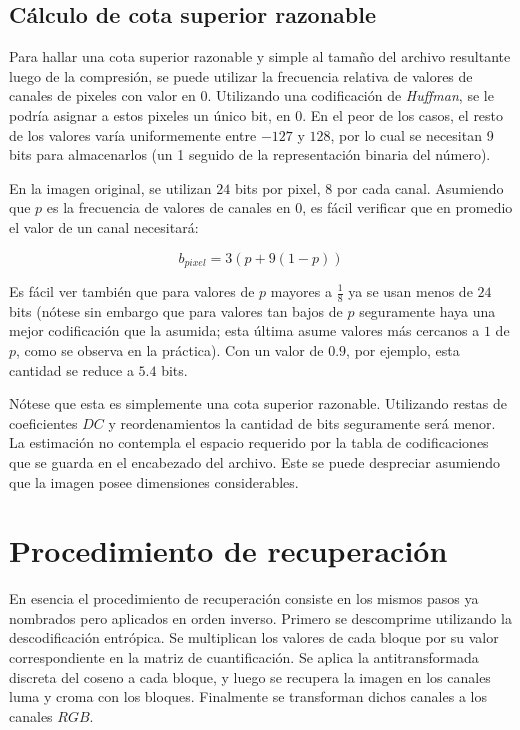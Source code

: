 \documentclass[%
	final,
	reprint,
	notitlepage,
	narroweqnarray,
	inline,
	twoside,
	invited
	]{ieee}
\begin{document}
\subsection{Cálculo de cota superior razonable}

\par Para hallar una cota superior razonable y simple al tamaño del archivo resultante luego de la compresión,
 se puede 
utilizar la frecuencia relativa de valores de canales de pixeles con valor en 0. 
Utilizando una codificación de \textit{Huffman}, 
se le podría asignar a estos pixeles un único bit, en 0. En el peor de los casos, el resto de los valores 
varía uniformemente entre $-127$ y $128$, por lo cual se necesitan 9 bits para almacenarlos (un 1 seguido 
de la representación binaria del número).
\par En la imagen original, se utilizan $24$ bits por pixel, $8$ por cada canal. Asumiendo que $p$ es la frecuencia 
de valores de canales en 0, es fácil verificar que en promedio el valor de un canal necesitará:

\begin{equation}
b_{pixel}=3(p+9(1-p))
\end{equation}

\par Es fácil ver también que para valores de $p$ mayores a $\frac{1}{8}$ ya se usan menos de $24$ bits (nótese sin 
embargo que para valores tan bajos de $p$ seguramente haya una mejor codificación que la asumida; esta última asume 
valores más cercanos a $1$ de $p$, como se observa en la práctica). Con un valor de $0.9$, por ejemplo, esta cantidad 
se reduce a $5.4$ bits.
\par Nótese que esta es simplemente una cota superior razonable. Utilizando restas de coeficientes $DC$ y reordenamientos 
la cantidad de bits seguramente será menor. La estimación no contempla el espacio requerido por la tabla de codificaciones 
que se guarda en el encabezado del archivo. Este se puede despreciar asumiendo que la imagen posee dimensiones considerables.



\section{Procedimiento de recuperación}

En esencia el procedimiento de recuperación consiste en los mismos pasos ya nombrados pero aplicados 
en orden inverso. Primero se descomprime utilizando la descodificación entrópica. Se multiplican 
los valores de cada bloque por su valor correspondiente en la matriz de cuantificación. Se aplica la 
antitransformada discreta del coseno a cada bloque, y luego se recupera la imagen en los canales luma y croma 
con los bloques. Finalmente se transforman dichos canales a los canales $RGB$.
\end{document}
